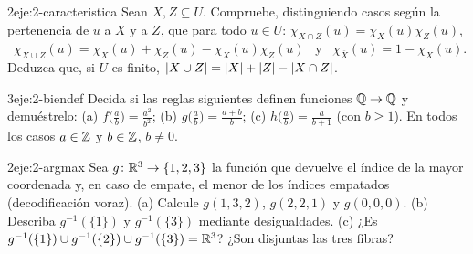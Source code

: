 \begin{ejercicio}{2}{eje:2-caracteristica}
Sean $X,Z\subseteq U$. Compruebe, distinguiendo casos según la pertenencia de $u$ a $X$ y a $Z$, que para todo $u\in U$:
$\chi_{X\cap Z}(u)=\chi_X(u)\chi_Z(u)$, \ $\chi_{X\cup Z}(u)=\chi_X(u)+\chi_Z(u)-\chi_X(u)\chi_Z(u)$ \ y \ $\chi_{\overline{X}}(u)=1-\chi_X(u)$.
Deduzca que, si $U$ es finito, $\lvert X\cup Z\rvert=\lvert X\rvert+\lvert Z\rvert-\lvert X\cap Z\rvert$.
\end{ejercicio}

\begin{ejercicio}{3}{eje:2-biendef}
Decida si las reglas siguientes definen funciones $\mathbb{Q}\to\mathbb{Q}$ y demuéstrelo: (a) $f\bigl(\tfrac ab\bigr)=\tfrac{a^{2}}{b^{2}}$; (b) $g\bigl(\tfrac ab\bigr)=\tfrac{a+b}{b}$; (c) $h\bigl(\tfrac ab\bigr)=\tfrac{a}{b+1}$ (con $b\ge1$). En todos los casos $a\in\mathbb{Z}$ y $b\in\mathbb{Z}$, $b\neq0$.
\end{ejercicio}

\begin{ejercicio}{2}{eje:2-argmax}
Sea $g\colon\mathbb{R}^{3}\to\{1,2,3\}$ la función que devuelve el índice de la mayor coordenada y, en caso de empate, el menor de los índices empatados (decodificación voraz). (a) Calcule $g(1,3,2)$, $g(2,2,1)$ y $g(0,0,0)$. (b) Describa $g^{-1}(\{1\})$ y $g^{-1}(\{3\})$ mediante desigualdades. (c) ¿Es $g^{-1}(\{1\})\cup g^{-1}(\{2\})\cup g^{-1}(\{3\})=\mathbb{R}^{3}$? ¿Son disjuntas las tres fibras?
\end{ejercicio}
